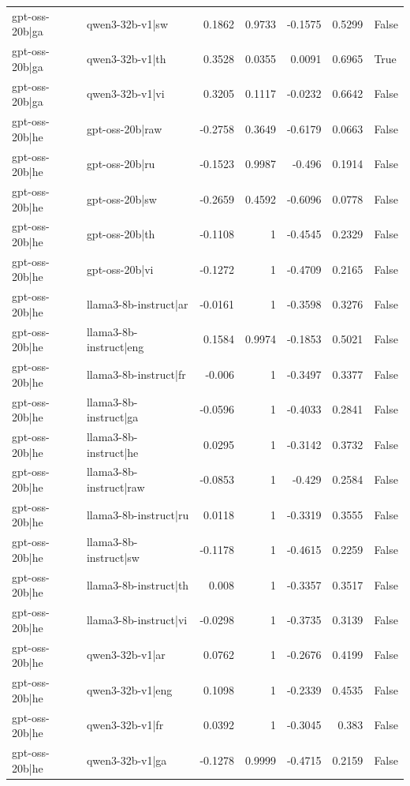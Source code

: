 \begin{table}
\begin{tabular}{l l r r r r l}
gpt-oss-20b|ga & qwen3-32b-v1|sw & 0.1862 & 0.9733 & -0.1575 & 0.5299 & False \\
gpt-oss-20b|ga & qwen3-32b-v1|th & 0.3528 & 0.0355 & 0.0091 & 0.6965 & True \\
gpt-oss-20b|ga & qwen3-32b-v1|vi & 0.3205 & 0.1117 & -0.0232 & 0.6642 & False \\
gpt-oss-20b|he & gpt-oss-20b|raw & -0.2758 & 0.3649 & -0.6179 & 0.0663 & False \\
gpt-oss-20b|he & gpt-oss-20b|ru & -0.1523 & 0.9987 & -0.496 & 0.1914 & False \\
gpt-oss-20b|he & gpt-oss-20b|sw & -0.2659 & 0.4592 & -0.6096 & 0.0778 & False \\
gpt-oss-20b|he & gpt-oss-20b|th & -0.1108 & 1 & -0.4545 & 0.2329 & False \\
gpt-oss-20b|he & gpt-oss-20b|vi & -0.1272 & 1 & -0.4709 & 0.2165 & False \\
gpt-oss-20b|he & llama3-8b-instruct|ar & -0.0161 & 1 & -0.3598 & 0.3276 & False \\
gpt-oss-20b|he & llama3-8b-instruct|eng & 0.1584 & 0.9974 & -0.1853 & 0.5021 & False \\
gpt-oss-20b|he & llama3-8b-instruct|fr & -0.006 & 1 & -0.3497 & 0.3377 & False \\
gpt-oss-20b|he & llama3-8b-instruct|ga & -0.0596 & 1 & -0.4033 & 0.2841 & False \\
gpt-oss-20b|he & llama3-8b-instruct|he & 0.0295 & 1 & -0.3142 & 0.3732 & False \\
gpt-oss-20b|he & llama3-8b-instruct|raw & -0.0853 & 1 & -0.429 & 0.2584 & False \\
gpt-oss-20b|he & llama3-8b-instruct|ru & 0.0118 & 1 & -0.3319 & 0.3555 & False \\
gpt-oss-20b|he & llama3-8b-instruct|sw & -0.1178 & 1 & -0.4615 & 0.2259 & False \\
gpt-oss-20b|he & llama3-8b-instruct|th & 0.008 & 1 & -0.3357 & 0.3517 & False \\
gpt-oss-20b|he & llama3-8b-instruct|vi & -0.0298 & 1 & -0.3735 & 0.3139 & False \\
gpt-oss-20b|he & qwen3-32b-v1|ar & 0.0762 & 1 & -0.2676 & 0.4199 & False \\
gpt-oss-20b|he & qwen3-32b-v1|eng & 0.1098 & 1 & -0.2339 & 0.4535 & False \\
gpt-oss-20b|he & qwen3-32b-v1|fr & 0.0392 & 1 & -0.3045 & 0.383 & False \\
gpt-oss-20b|he & qwen3-32b-v1|ga & -0.1278 & 0.9999 & -0.4715 & 0.2159 & False \\

\end{tabular}
\end{table}
